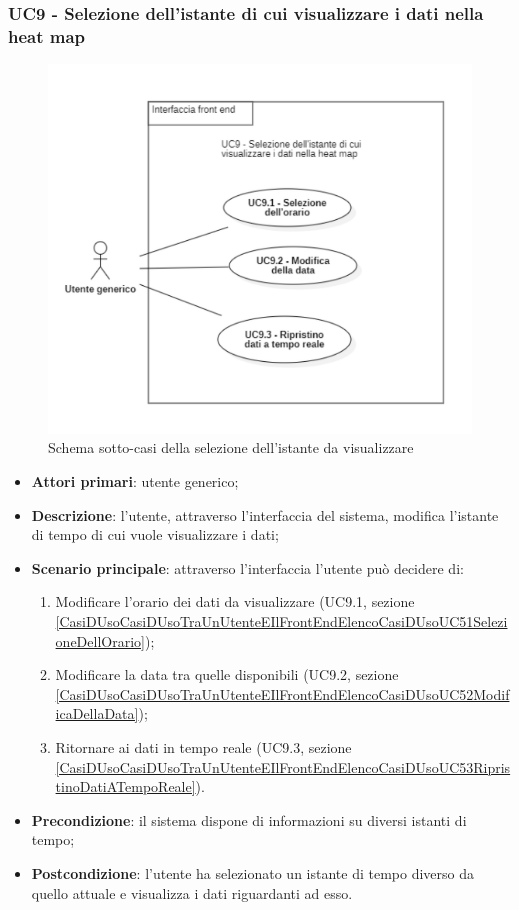 \subsubsection{UC9 - Selezione dell’istante di cui visualizzare i dati nella heat map
}\label{CasiDUsoCasiDUsoTraUnUtenteEIlFrontEndElencoCasiDUsoUC5SelezioneDellIstanzeDiCuiVisualizzareIDatiNellaHeatmap}%
\begin{center}
	\begin{figure}[H]
		\centering\includegraphics[scale=0.8]{../immagini/attori_casi/UC_9.png}
		\caption{Schema sotto-casi della selezione dell'istante da visualizzare}
	\end{figure}
\end{center}
\begin{itemize}
	\item \textbf{Attori primari}: utente generico;
	\item \textbf{Descrizione}: l’utente, attraverso l’interfaccia del sistema, modifica l’istante di tempo di cui vuole visualizzare i dati;
	\item \textbf{Scenario principale}: attraverso l’interfaccia l’utente può decidere di:
		\begin{enumerate}
			\item Modificare l’orario dei dati da visualizzare (UC9.1, sezione  \ref{CasiDUsoCasiDUsoTraUnUtenteEIlFrontEndElencoCasiDUsoUC51SelezioneDellOrario});
			\item Modificare la data tra quelle disponibili (UC9.2, sezione \ref{CasiDUsoCasiDUsoTraUnUtenteEIlFrontEndElencoCasiDUsoUC52ModificaDellaData});
			\item Ritornare ai dati in tempo reale (UC9.3, sezione \ref{CasiDUsoCasiDUsoTraUnUtenteEIlFrontEndElencoCasiDUsoUC53RipristinoDatiATempoReale}).
		\end{enumerate}
	\item \textbf{Precondizione}: il sistema dispone di informazioni su diversi istanti di tempo;
	\item \textbf{Postcondizione}: l’utente ha selezionato un istante di tempo diverso da quello attuale e visualizza i dati riguardanti ad esso.%
\end{itemize}

